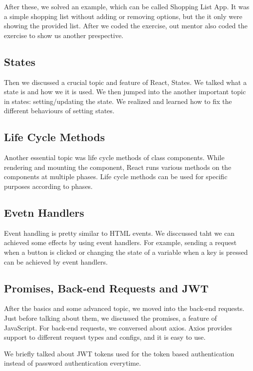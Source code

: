 After these, we solved an example, which can be called Shopping List App. It was a simple shopping list without adding or removing options, but the it only were showing the provided list. After we coded the exercise, out mentor also coded the exercise to show us another prespective.

\subsection{States}

Then we discussed a crucial topic and feature of React, States. We talked what a state is and how we it is used. We then jumped into the another important topic in states: setting/updating the state. We realized and learned how to fix the different behaviours of setting states.

\subsection{Life Cycle Methods}

Another essential topic was life cycle methods of class components. While rendering and mounting the component, React runs various methods on the components at multiple phases. Life cycle methods can be used for specific purposes according to phases.

\subsection{Evetn Handlers}

Event handling is pretty similar to HTML events. We disccussed taht we can achieved some effects by using event handlers. For example, sending a request when a button is clicked or changing the state of a variable when a key is pressed can be achieved by event handlers.

\subsection{Promises, Back-end Requests and JWT}

After the basics and some advanced topic, we moved into the back-end requests. Just before talking about them, we discussed the promises, a feature of JavaScript. For back-end requests, we conversed about axios. Axios provides support to different request types and configs, and it is easy to use.

We briefly talked about JWT tokens used for the token based authentication instead of password authentication everytime.





